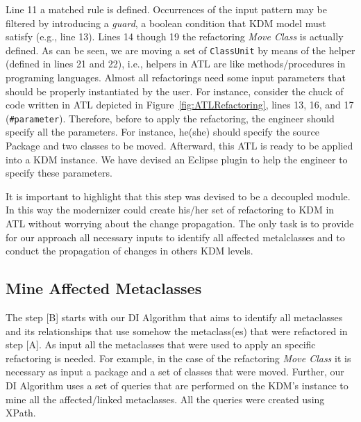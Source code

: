 
Line 11 a matched rule is defined. %
Occurrences of the input pattern may be filtered by introducing a \textit{guard}, a boolean condition that KDM model must satisfy (e.g., line 13). Lines 14 though 19 the refactoring \textit{Move Class} is actually defined. As can be seen, we are moving a set of \texttt{ClassUnit} by means of the helper (defined in lines 21 and 22), i.e., helpers in ATL are like methods/procedures in programing languages. 
Almost all refactorings need some input parameters that should be properly instantiated by the user. For instance, consider the chuck of code written in ATL depicted in Figure~\ref{fig:ATLRefactoring}, lines 13, 16, and 17 (\texttt{\#parameter}). Therefore, before to apply the refactoring, the engineer should specify all the parameters. For instance, he(she) should specify the source Package and two classes to be moved. 
Afterward, this ATL is ready to be applied into a KDM instance. We have devised an Eclipse plugin to help the engineer to specify these parameters.




It is important to highlight that this step was devised to be a decoupled module. In this way the modernizer could create his/her set of refactoring to KDM in ATL without worrying about the change propagation. The only task is to provide for our approach all necessary inputs to identify all affected metalclasses and to conduct the propagation of changes in others KDM levels.

\subsection{Mine Affected Metaclasses} %
\label{sub:mine_affected_metaclasses}

The step [B] starts with our DI Algorithm that aims to identify all metaclasses and its relationships that use somehow the metaclass(es) that were refactored in step [A]. As input all the metaclasses that were used to apply an specific refactoring is needed. For example, in the case of the refactoring \textit{Move Class} it is necessary as input a package and a set of classes that were moved. Further, our DI Algorithm uses a set of queries that are performed on the KDM's instance to mine all the affected/linked metaclasses. All the queries were created using XPath. %

